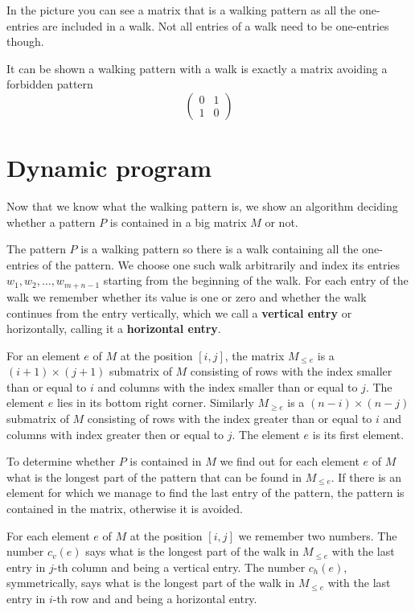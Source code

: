 In the picture you can see a matrix that is a walking pattern as all the one-entries are included in a walk. Not all entries of a walk need to be one-entries though.

It can be shown a walking pattern with a walk is exactly a matrix avoiding a forbidden pattern
$$\left(\begin{array}{cc}
0 & 1 \\
1 & 0
\end{array}\right)$$

\section{Dynamic program}
Now that we know what the walking pattern is, we show an algorithm deciding whether a pattern $P$ is contained in a big matrix $M$ or not.

The pattern $P$ is a walking pattern so there is a walk containing all the one-entries of the pattern. We choose one such walk arbitrarily and index its entries $w_1,w_2,\dots,w_{m+n-1}$ starting from the beginning of the walk. For each entry of the walk we remember whether its value is one or zero and whether the walk continues from the entry vertically, which we call a \textbf{vertical entry} or horizontally, calling it a \textbf{horizontal entry}.

For an element $e$ of $M$ at the position $[i,j]$, the matrix $M_{\leq e}$ is a $(i+1)\times(j+1)$ submatrix of $M$ consisting of rows with the index smaller than or equal to $i$ and columns with the index smaller than or equal to $j$. The element $e$ lies in its bottom right corner. Similarly $M_{\geq e}$ is a $(n-i)\times(n-j)$ submatrix of $M$ consisting of rows with the index greater than or equal to $i$ and columns with index greater then or equal to $j$. The element $e$ is its first element.

To determine whether $P$ is contained in $M$ we find out for each element $e$ of $M$ what is the longest part of the pattern that can be found in $M_{\leq e}$. If there is an element for which we manage to find the last entry of the pattern, the pattern is contained in the matrix, otherwise it is avoided.

For each element $e$ of $M$ at the position $[i,j]$ we remember two numbers. The number $c_v(e)$ says what is the longest part of the walk in $M_{\leq e}$ with the last entry in $j$-th column and being a vertical entry. The number $c_h(e)$, symmetrically, says what is the longest part of the walk in $M_{\leq e}$ with the last entry in $i$-th row and and being a horizontal entry.


